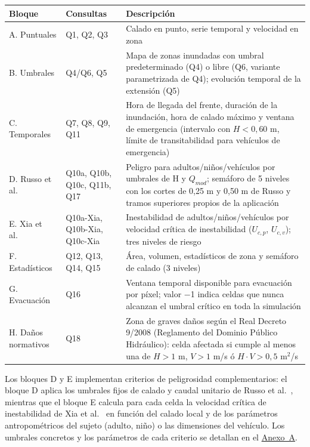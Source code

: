 \begin{center}
\begin{tabularx}{\textwidth}{>{\raggedright\arraybackslash}p{3.2cm}>{\raggedright\arraybackslash}p{4.5cm}L}
\toprule
\textbf{Bloque} & \textbf{Consultas} & \textbf{Descripción} \\
\midrule
A. Puntuales & Q1, Q2, Q3 & Calado en punto, serie temporal y velocidad en zona \\
B. Umbrales & Q4/Q6, Q5 & Mapa de zonas inundadas con umbral predeterminado (Q4) o libre (Q6, variante parametrizada de Q4); evolución temporal de la extensión (Q5) \\
C. Temporales & Q7, Q8, Q9, Q11 & Hora de llegada del frente, duración de la inundación, hora de calado máximo y ventana de emergencia (intervalo con $H < 0{,}60$ m, límite de transitabilidad para vehículos de emergencia) \\
D. Russo et al.\ \cite{russo2013} & Q10a, Q10b, Q10c, Q11b, Q17 & Peligro para adultos/niños/vehículos por umbrales de H y $Q_{mod}$; semáforo de 5 niveles con los cortes de 0,25 m y 0,50 m de Russo y tramos superiores propios de la aplicación \\
E. Xia et al.\ \cite{xia2011vehicles, xia2014} & Q10a-Xia, Q10b-Xia, Q10c-Xia & Inestabilidad de adultos/niños/vehículos por velocidad crítica de inestabilidad ($U_{c,p}$, $U_{c,v}$); tres niveles de riesgo \\
F. Estadísticos & Q12, Q13, Q14, Q15 & Área, volumen, estadísticos de zona y semáforo de calado (3 niveles) \\
G. Evacuación & Q16 & Ventana temporal disponible para evacuación por píxel; valor $-$1 indica celdas que nunca alcanzan el umbral crítico en toda la simulación \\
H. Daños normativos & Q18 & Zona de graves daños según el Real Decreto 9/2008 (Reglamento del Dominio Público Hidráulico): celda afectada si cumple al menos una de $H > 1$ m, $V > 1$ m/s ó $H{\cdot}V > 0{,}5$ m$^2$/s \\
\bottomrule
\end{tabularx}
\captionsetup{hypcap=false}
\label{tab:bloques-queries}
\end{center}

Los bloques D y E implementan criterios de peligrosidad complementarios: el bloque D aplica los umbrales fijos de calado y caudal unitario de Russo et al.\ \cite{russo2013}, mientras que el bloque E calcula para cada celda la velocidad crítica de inestabilidad de Xia et al.\ \cite{xia2014, xia2011vehicles} en función del calado local y de los parámetros antropométricos del sujeto (adulto, niño) o las dimensiones del vehículo. Los umbrales concretos y los parámetros de cada criterio se detallan en el \hyperref[anexo-a.-catalogo-completo-de-consultas-analiticas]{Anexo~A}.



